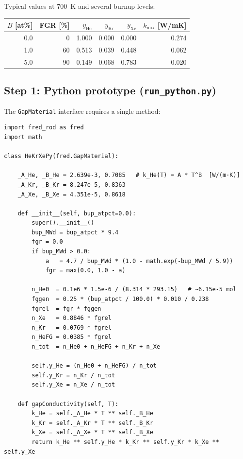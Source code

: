 \documentclass[11pt,a4paper]{article}
\begin{document}
\noindent Typical values at 700~K and several burnup levels:

\begin{center}
\begin{tabular}{rrrrrr}
\toprule
$B$ [at\%] & FGR [\%] & $y_\text{He}$ & $y_\text{Kr}$ & $y_\text{Xe}$
           & $k_\text{mix}$ [W/mK] \\
\midrule
0.0 & 0   & 1.000 & 0.000 & 0.000 & 0.274 \\
1.0 & 60  & 0.513 & 0.039 & 0.448 & 0.062 \\
5.0 & 90  & 0.149 & 0.068 & 0.783 & 0.020 \\
\bottomrule
\end{tabular}
\end{center}

\subsection{Step 1: Python prototype (\texttt{run\_python.py})}

The \texttt{GapMaterial} interface requires a single method:

\begin{lstlisting}
import fred_rod as fred
import math

class HeKrXePy(fred.GapMaterial):

    _A_He, _B_He = 2.639e-3, 0.7085   # k_He(T) = A * T^B  [W/(m·K)]
    _A_Kr, _B_Kr = 8.247e-5, 0.8363
    _A_Xe, _B_Xe = 4.351e-5, 0.8618

    def __init__(self, bup_atpct=0.0):
        super().__init__()
        bup_MWd = bup_atpct * 9.4
        fgr = 0.0
        if bup_MWd > 0.0:
            a   = 4.7 / bup_MWd * (1.0 - math.exp(-bup_MWd / 5.9))
            fgr = max(0.0, 1.0 - a)

        n_He0  = 0.1e6 * 1.5e-6 / (8.314 * 293.15)   # ~6.15e-5 mol
        fggen  = 0.25 * (bup_atpct / 100.0) * 0.010 / 0.238
        fgrel  = fgr * fggen
        n_Xe   = 0.8846 * fgrel
        n_Kr   = 0.0769 * fgrel
        n_HeFG = 0.0385 * fgrel
        n_tot  = n_He0 + n_HeFG + n_Kr + n_Xe

        self.y_He = (n_He0 + n_HeFG) / n_tot
        self.y_Kr = n_Kr / n_tot
        self.y_Xe = n_Xe / n_tot

    def gapConductivity(self, T):
        k_He = self._A_He * T ** self._B_He
        k_Kr = self._A_Kr * T ** self._B_Kr
        k_Xe = self._A_Xe * T ** self._B_Xe
        return k_He ** self.y_He * k_Kr ** self.y_Kr * k_Xe ** self.y_Xe
\end{lstlisting}
\end{document}
